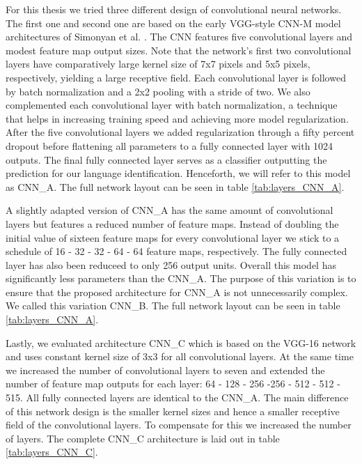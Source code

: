 For this thesis we tried three different design of convolutional neural networks. The first one and second one are based on the early VGG-style CNN-M model architectures of Simonyan et al. \cite{Chatfield14}. The CNN features five convolutional layers and modest feature map output sizes. Note that the network's first two convolutional layers have comparatively large kernel size of 7x7 pixels and 5x5 pixels, respectively, yielding a large receptive field. Each convolutional layer is followed by batch normalization and a 2x2 pooling with a stride of two. We also complemented each convolutional layer with batch normalization\cite{ioffe2015batch}, a technique that helps in increasing training speed and achieving more model regularization. After the five convolutional layers we added regularization through a fifty percent dropout before flattening all parameters to a fully connected layer with 1024 outputs. The final fully connected layer serves as a classifier outputting the prediction for our language identification. Henceforth, we will refer to this model as CNN\_A. The full network layout can be seen in table \ref{tab:layers_CNN_A}.

A slightly adapted version of CNN\_A has the same amount of convolutional layers but features  a reduced number of feature maps. Instead of doubling the initial value of sixteen feature maps for every convolutional layer we stick to a schedule of 16 - 32 - 32 - 64 - 64 feature maps, respectively. The fully connected layer has also been reduceed to only 256 output units. Overall this model has significantly less parameters than the CNN\_A. The purpose of this variation is to ensure that the proposed architecture for CNN\_A is not unnecessarily complex. We called this variation CNN\_B. The full network layout can be seen in table \ref{tab:layers_CNN_A}.

	
Lastly, we evaluated architecture CNN\_C which is based on the VGG-16 network\cite{simonyan2014very} and uses constant kernel size of 3x3 for all convolutional layers. At the same time we increased the number of convolutional layers to seven and extended the number of feature map outputs for each layer: 64 - 128 - 256 -256 - 512 - 512 - 515. All fully connected layers are identical to the CNN\_A. The main difference of this network design is the smaller kernel sizes and hence a smaller receptive field of the convolutional layers. To compensate for this we increased the number of layers. The complete CNN\_C architecture is laid out in table \ref{tab:layers_CNN_C}.


